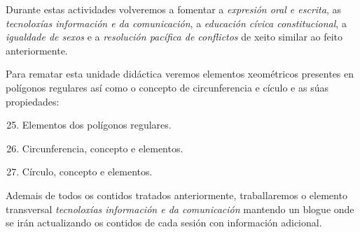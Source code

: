 Durante estas actividades volveremos a fomentar a \emph{expresión oral e escrita}, as \emph{tecnoloxías información e da comunicación}, a \emph{educación cívica constitucional}, a \emph{igualdade de sexos} e a \emph{resolución pacífica de conflictos} de xeito similar ao feito anteriormente.

Para rematar esta unidade didáctica veremos elementos xeométricos presentes en polígonos regulares así como o concepto de circunferencia e cículo e as súas propiedades:

\begin{enumerate}[label=\bfseries Con\arabic*, align=left, leftmargin=1.5cm]
  \setcounter{enumi}{24}
  \item\label{con:regulares} Elementos dos polígonos regulares.
  \item\label{con:circunferencia} Circunferencia, concepto e elementos.
  \item\label{con:circulo} Círculo, concepto e elementos.
\end{enumerate}

Ademais de todos os contidos tratados anteriormente, traballaremos o elemento transversal \emph{tecnoloxías información e da comunicación} mantendo un blogue onde se irán actualizando os contidos de cada sesión con información adicional.
